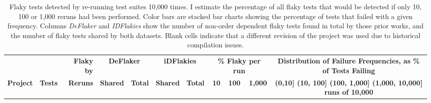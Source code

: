 \begin{table*}[t]
    \caption[Flaky tests detected by re-running test suites 10,000 times]{Flaky tests detected by re-running test suites 10,000 times. \textnormal{I estimate the percentage of all flaky tests that would be detected if only 10, 100 or 1,000 reruns had been performed. Color bars are stacked bar charts showing the percentage of tests that failed with a given frequency. Columns \emph{DeFlaker} and \emph{IDFlakies} show the number of non-order dependent flaky tests found in total by those prior works, and the number of flaky tests shared by both datasets. Blank cells indicate that a different revision of the project was used due to historical compilation issues.}}
\label{table:rerun_result}
\vspace{-5pt}
\setlength{\tabcolsep}{1pt}
\setlength{\textwidth}{0.5pt}
\newcommand{\failureRateWidth}{2.5in}
\newcommand{\failureRateHeight}{1em}
\scriptsize
\centering
    \begin{tabular}{lrr|rr|rr|rrr|c}
    \toprule
    & & \textbf{Flaky by} & \multicolumn{2}{c}{\textbf{DeFlaker} \cite{bell2018deflaker}} & \multicolumn{2}{c}{\textbf{iDFlakies} \cite{lam2019idflakies}} & \multicolumn{3}{c}{\textbf{\% Flaky per run}} & \textbf{Distribution of Failure Frequencies, as \% of Tests Failing} \\
    
    \textbf{Project}&\textbf{Tests}& \textbf{Reruns}&\textbf{Shared} & \textbf{Total} & \textbf{Shared}&\textbf{Total} &\textbf{10}&\textbf{100}&\textbf{1,000}& \textbf{
  \textcolor{c1}{ (0,10]} \textcolor{c2}{ (10, 100]} \textcolor{c3}{ (100, 1,000]} \textcolor{c4}{ (1,000, 10,000]} runs of 10,000} \\
\midrule


\end{tabular}
\end{table*}
